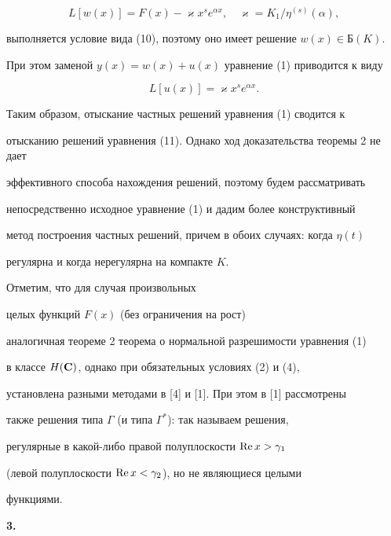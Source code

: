 $$


L[w(x)]=F(x)-\varkappa x^s e^{\alpha x},


\quad \varkappa=K_1/\eta^{(s)}(\alpha),


$$


выполняется условие вида (10), поэтому оно имеет решение $w(x)\in Б(K)$.


При этом заменой $y(x)=w(x)+u(x)$ уравнение (1) приводится к виду


\begin{equation}


L[u(x)]=\varkappa x^s e^{\alpha x}.


\end{equation}





Таким образом, отыскание частных решений уравнения (1) сводится к


отысканию решений уравнения (11). Однако ход доказательства теоремы 2 не дает


эффективного способа нахождения решений, поэтому будем рассматривать


непосредственно исходное уравнение (1) и дадим более конструктивный


метод построения частных решений, причем в обоих случаях: когда $\eta(t)$


регулярна и когда нерегулярна на компакте $K$.





Отметим, что для случая произвольных 


целых функций $F(x)$ (без ограничения на рост)


аналогичная теореме 2 теорема о нормальной разрешимости уравнения (1)


в классе $H({\bold C})$, однако при обязательных условиях (2) и (4),


установлена разными методами в [4] и [1]. При этом в [1] рассмотрены


также решения типа $\Gamma$ (и типа $\Gamma^*$): так называем решения,


регулярные в какой-либо правой полуплоскости $\operatorname{Re} x>\gamma_1$


(левой полуплоскости $\operatorname{Re} x<\gamma_2$), но не являющиеся целыми


функциями.


\medskip





{\bf 3.}


